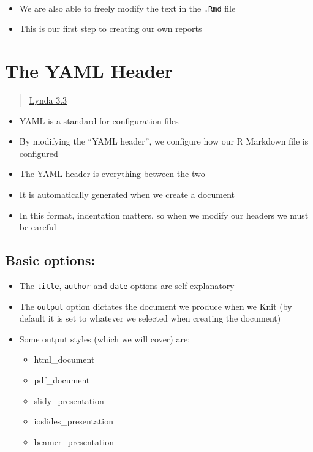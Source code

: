 \documentclass[]{article}
\providecommand{\tightlist}{%
  \setlength{\itemsep}{0pt}\setlength{\parskip}{0pt}}
\begin{document}
~

\begin{itemize}
\tightlist
\item
  We are also able to freely modify the text in the \texttt{.Rmd} file
\item
  This is our first step to creating our own reports
\end{itemize}

\hypertarget{the-yaml-header}{%
\section{The YAML Header}\label{the-yaml-header}}

\begin{quote}
\href{https://www.lynda.com/RStudio-tutorials/YAML-header-Rmd-file/699348/2801131-4.html?srchtrk=index\%3a1\%0alinktypeid\%3a2\%0aq\%3ar+markdown\%0apage\%3a1\%0as\%3arelevance\%0asa\%3atrue\%0aproducttypeid\%3a2}{Lynda
3.3}
\end{quote}

\begin{itemize}
\tightlist
\item
  YAML is a standard for configuration files
\item
  By modifying the ``YAML header'', we configure how our R Markdown file
  is configured
\item
  The YAML header is everything between the two \texttt{-\/-\/-}
\item
  It is automatically generated when we create a document
\item
  In this format, indentation matters, so when we modify our headers we
  must be careful
\end{itemize}

\hypertarget{basic-options}{%
\subsection{Basic options:}\label{basic-options}}

\begin{itemize}
\tightlist
\item
  The \texttt{title}, \texttt{author} and \texttt{date} options are
  self-explanatory
\item
  The \texttt{output} option dictates the document we produce when we
  Knit (by default it is set to whatever we selected when creating the
  document)
\item
  Some output styles (which we will cover) are:

  \begin{itemize}
  \tightlist
  \item
    html\_document
  \item
    pdf\_document
  \item
    slidy\_presentation
  \item
    ioslides\_presentation
  \item
    beamer\_presentation
  \end{itemize}
\end{itemize}
\end{document}
